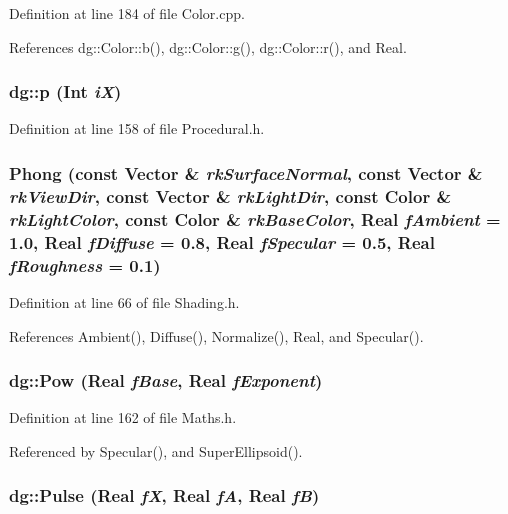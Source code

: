 Definition at line 184 of file Color.cpp.

References dg::Color::b(), dg::Color::g(), dg::Color::r(), and Real.
\subsubsection{ dg::p ({\bf Int} {\em i\-X})\hspace{0.3cm}{\tt  [inline]}}\label{namespacedg_a146}




Definition at line 158 of file Procedural.h.
\subsubsection{ Phong (const {\bf Vector} \& {\em rk\-Surface\-Normal}, const {\bf Vector} \& {\em rk\-View\-Dir}, const {\bf Vector} \& {\em rk\-Light\-Dir}, const {\bf Color} \& {\em rk\-Light\-Color}, const {\bf Color} \& {\em rk\-Base\-Color}, {\bf Real} {\em f\-Ambient} = 1.0, {\bf Real} {\em f\-Diffuse} = 0.8, {\bf Real} {\em f\-Specular} = 0.5, {\bf Real} {\em f\-Roughness} = 0.1)\hspace{0.3cm}{\tt  [inline]}}\label{namespacedg_a176}




Definition at line 66 of file Shading.h.

References Ambient(), Diffuse(), Normalize(), Real, and Specular().
\subsubsection{ dg::Pow ({\bf Real} {\em f\-Base}, {\bf Real} {\em f\-Exponent})\hspace{0.3cm}{\tt  [inline]}}\label{namespacedg_a97}




Definition at line 162 of file Maths.h.

Referenced by Specular(), and Super\-Ellipsoid().
\subsubsection{ dg::Pulse ({\bf Real} {\em f\-X}, {\bf Real} {\em f\-A}, {\bf Real} {\em f\-B})\hspace{0.3cm}{\tt  [inline]}}\label{namespacedg_a157}




